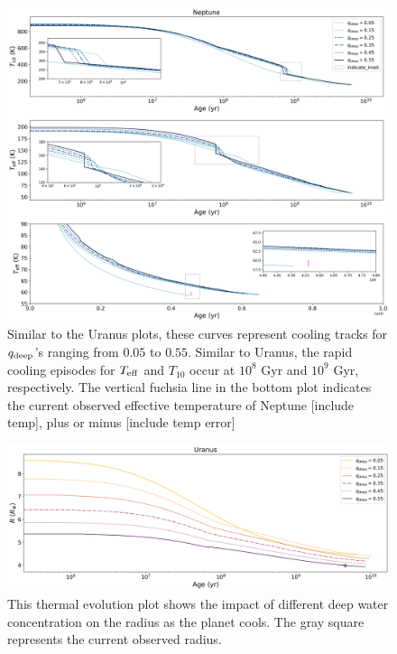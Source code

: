 \documentclass[11pt]{ucscthesisbs}
\begin{document}
\begin{figure}[ht]
 \centerline{
  \includegraphics[scale=0.45]{figures/n_cooling_curves_nz_4096_more_qdeeps.png}
 }
\caption[Thermal Evolution Curves for Neptune - Water Vapor Concentration Comparisons]
{Similar to the Uranus plots, these curves represent cooling tracks for $q_{\rm deep}$'s ranging from $0.05$ to $0.55$. Similar to Uranus, the rapid cooling episodes for $T_{\rm eff}$ and $T_{10}$ occur at $10^8$ Gyr and $10^9$ Gyr, respectively. The vertical fuchsia line in the bottom plot indicates the current observed effective temperature of Neptune [include temp], plus or minus [include temp error] }
\label{fig:evolve_neptune_qdeeps}
\end{figure}



\begin{figure}[ht]
 \centerline{
  \includegraphics[scale=0.45]{figures/u_cooling_radius_nz_4096_logx_more_qdeeps.png}
 }
\caption[Thermal Evolution Curves for Uranus - Radius]
{This thermal evolution plot shows the impact of different deep water concentration on the radius as the planet cools. The gray square represents the current observed radius.}
\label{fig:evolve_uranus_radius}
\end{figure}
\end{document}
